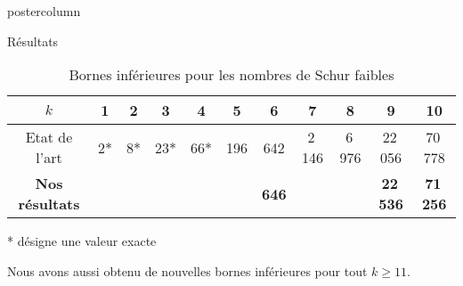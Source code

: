 \documentclass[roundedcorners=true, titleposition=left]{beamerthemeruhuisstijlposter}
\begin{document}
\begin{frame}
\begin{columns}
\begin{column}{0.49\textwidth}
\begin{beamercolorbox}[center, wd=\textwidth]{postercolumn}
\begin{minipage}[T]{0.95\textwidth}
{\begin{block}{Résultats}
\begin{center}
\begin{table}
\begin{normalsize}
		\end{normalsize}
	\end{table}
	
	\vspace{1ex}

    \begin{table}
		\caption{\large Bornes inférieures pour les nombres de Schur faibles}
        \begin{normalsize}
    		\begin{tabular}{|*{11}{c|}}
    		    \hline
    		    \(k\) & 1 & 2 & 3 & 4 & 5 & 6 & 7 & 8 & 9 & 10 \\
    		    \hline
    		    Etat de l'art & 2* & 8* & 23* & 66* & 196 & 642 & 2\,146 & 6\,976 & 22\,056 & 70\,778 \\
    		    \hline
    		    \textbf{Nos résultats} & & & & & &\textbf{646} & & & \textbf{22\,536} & \textbf{71\,256} \\
    		    \hline
    		\end{tabular}
    	\end{normalsize}
    \end{table}
    \vspace{1ex}
	* désigne une valeur exacte
\end{center}
Nous avons aussi obtenu de nouvelles bornes inférieures pour tout \(k \geqslant 11\).
\end{block}
\medskip

}
\end{minipage}
\end{beamercolorbox}
\end{column}
\end{columns}
\end{frame}
\end{document}
